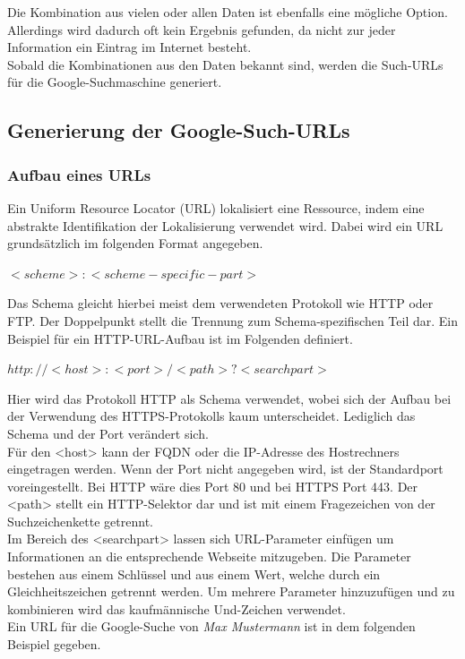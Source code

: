 		
		Die Kombination aus vielen oder allen Daten ist ebenfalls eine mögliche Option. Allerdings wird dadurch oft kein Ergebnis gefunden, da nicht zur jeder Information ein Eintrag im Internet besteht.\\
		Sobald die Kombinationen aus den Daten bekannt sind, werden die Such-URLs für die Google-Suchmaschine generiert.
		\subsection{Generierung der Google-Such-URLs}
			\subsubsection{Aufbau eines URLs}
			\label{subsec:AufbauURL}
			Ein Uniform Resource Locator (URL) lokalisiert eine Ressource, indem eine abstrakte Identifikation der Lokalisierung verwendet wird. Dabei wird ein URL grundsätzlich im folgenden Format angegeben.\cite{RFC1738}
			
			$<scheme>:<scheme-specific-part>$ \cite{RFC1738}
			
			Das Schema gleicht hierbei meist dem verwendeten Protokoll wie HTTP oder FTP. Der Doppelpunkt stellt die Trennung zum Schema-spezifischen Teil dar. Ein Beispiel für ein HTTP-URL-Aufbau ist im Folgenden definiert.\cite{RFC1738}
			
			$http://<host>:<port>/<path>?<searchpart>$\cite{RFC1738}
			
			Hier wird das Protokoll HTTP als Schema verwendet, wobei sich der Aufbau bei der Verwendung des HTTPS-Protokolls kaum unterscheidet. Lediglich das Schema und der Port verändert sich.\\
			Für den <host> kann der FQDN oder die IP-Adresse des Hostrechners eingetragen werden. Wenn der Port nicht angegeben wird, ist der Standardport voreingestellt. Bei HTTP wäre dies Port 80 und bei HTTPS Port 443. Der <path> stellt ein HTTP-Selektor dar und ist mit einem Fragezeichen von der Suchzeichenkette getrennt.\cite{RFC1738}\\ %
			Im Bereich des <searchpart> lassen sich URL-Parameter einfügen um Informationen an die entsprechende Webseite mitzugeben. Die Parameter bestehen aus einem Schlüssel und aus einem Wert, welche durch ein Gleichheitszeichen getrennt werden. Um mehrere Parameter hinzuzufügen und zu kombinieren wird das kaufmännische Und-Zeichen verwendet.\cite{GoogleURL}\\
			Ein URL für die Google-Suche von \textit{Max Mustermann} ist in dem folgenden Beispiel gegeben.
			
